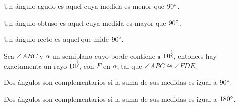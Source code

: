 \begin{definition}
    Un ángulo agudo es aquel cuya medida es menor que $90^{\circ}$.
\end{definition}

\begin{definition}
    Un ángulo obtuso es aquel cuya medida es mayor que $90^{\circ}$.
\end{definition}

\begin{definition}
    Un ángulo recto es aquel que mide $90^{\circ}$.
\end{definition}

\clearpage

\begin{theorem}
    Sea $\angle{ABC}$ y $\alpha$ un semiplano cuyo borde contiene a $\overrightarrow{\rm DE}$, entonces hay exactamente un rayo $\overrightarrow{\rm DF}$, con $F$ en $\alpha$, tal que $\angle{ABC} \cong \angle{FDE}$.

    \begin{figure}[h!]
    
        \centering
    
        \begin{subfigure}[b]{.3\textwidth}
            \centering
            
            \label{fig:postulado34}
        \end{subfigure}%
        \begin{subfigure}[b]{.3\textwidth}
            \centering
            
            \label{fig:postulado35}
        \end{subfigure}
    
        \label{fig:angle-const-theorem}
        
    \end{figure}        
    
\end{theorem}

\begin{definition}
    Dos ángulos son complementarios si la suma de sus medidas es igual a $90^{\circ}$.
\end{definition}

\begin{definition}
    Dos ángulos son complementarios si la suma de sus medidas es igual a $180^{\circ}$.
\end{definition}

